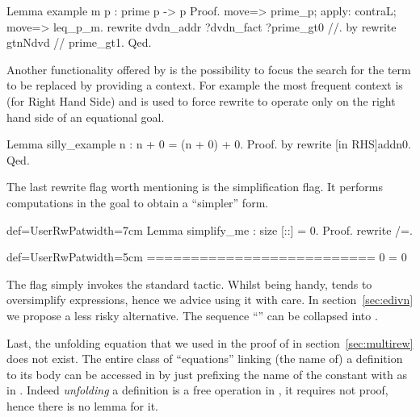 \begin{coq}{}{}
Lemma example m p : prime p -> p %
Proof.
move=> prime_p; apply: contraL; move=> leq_p_m.
rewrite dvdn_addr ?dvdn_fact ?prime_gt0 //.
by rewrite gtnNdvd // prime_gt1.
Qed.
\end{coq}

Another functionality offered by  is the possibility
to focus the search for the term to be replaced by providing a
context.  For example the most frequent context is  (for Right
Hand Side) and is used to force rewrite to operate only on the right
hand side of an equational goal.

\begin{coq}{}{}
Lemma silly_example n : n + 0 = (n + 0) + 0.
Proof. by rewrite [in RHS]addn0. Qed.
\end{coq}


The last rewrite flag worth mentioning is the \C{/=} simplification
flag.  It performs computations in the goal to obtain a ``simpler'' form.

\begin{coq}{def=UserRwPat}{width=7cm}
Lemma simplify_me : size [::] = 0.
Proof.
rewrite /=.
\end{coq}
\begin{coqout}{def=UserRwPat}{width=5cm}
==========================
0 = 0
\end{coqout}
The \C{/=} flag simply invokes the \Coq{} standard 
tactic.  Whilst being handy,  tends to oversimplify
expressions, hence we advice using it with care.
In section~\ref{sec:edivn} we propose a less risky alternative.
The sequence ``\C{// /=}'' can be collapsed into \C{//=}.

Last, the unfolding equation  that we used in
the proof of  in section~\ref{sec:multirew}
does not exist.  The entire class of ``equations'' linking
(the name of) a definition to its body can be accessed in
 by just prefixing the name of the constant with
\C{/} as in .  Indeed \emph{unfolding} a definition is a free
operation in \Coq{}, it requires not proof, hence there is
no lemma for it.

\label{sec:rewrite2}

